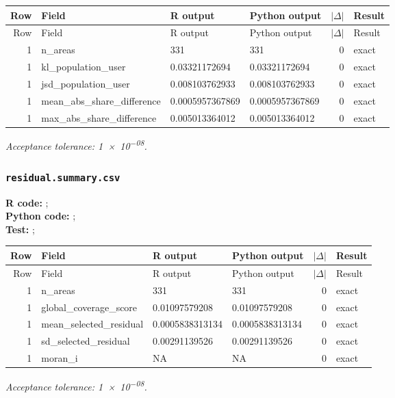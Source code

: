 \documentclass[10pt]{article}
\begin{document}
\small
\begin{longtable}{@{}r p{}p{}p{}rl@{}}
\toprule
Row & Field & R output & Python output & $|\Delta|$ & Result \\
\midrule
\endfirsthead
\toprule
Row & Field & R output & Python output & $|\Delta|$ & Result \\
\midrule
\endhead
1 & n\_\allowbreak{}areas & 331 & 331 & 0 & exact \\
1 & kl\_\allowbreak{}population\_\allowbreak{}user & 0.03321172694 & 0.03321172694 & 0 & exact \\
1 & jsd\_\allowbreak{}population\_\allowbreak{}user & 0.008103762933 & 0.008103762933 & 0 & exact \\
1 & mean\_\allowbreak{}abs\_\allowbreak{}share\_\allowbreak{}difference & 0.0005957367869 & 0.0005957367869 & 0 & exact \\
1 & max\_\allowbreak{}abs\_\allowbreak{}share\_\allowbreak{}difference & 0.005013364012 & 0.005013364012 & 0 & exact \\
\bottomrule
\end{longtable}
\normalsize
\textit{Acceptance tolerance: \num{1e-08}.}

\subsubsection{\texorpdfstring{\texttt{residual.summary.csv}}{residual.summary.csv}}
{\footnotesize \textbf{R code:} ; \\ \textbf{Python code:} ; \\ \textbf{Test:} ; \par}

\small
\begin{longtable}{@{}r p{}p{}p{}rl@{}}
\toprule
Row & Field & R output & Python output & $|\Delta|$ & Result \\
\midrule
\endfirsthead
\toprule
Row & Field & R output & Python output & $|\Delta|$ & Result \\
\midrule
\endhead
1 & n\_\allowbreak{}areas & 331 & 331 & 0 & exact \\
1 & global\_\allowbreak{}coverage\_\allowbreak{}score & 0.01097579208 & 0.01097579208 & 0 & exact \\
1 & mean\_\allowbreak{}selected\_\allowbreak{}residual & 0.0005838313134 & 0.0005838313134 & 0 & exact \\
1 & sd\_\allowbreak{}selected\_\allowbreak{}residual & 0.00291139526 & 0.00291139526 & 0 & exact \\
1 & moran\_\allowbreak{}i & NA & NA & 0 & exact \\
\bottomrule
\end{longtable}
\normalsize
\textit{Acceptance tolerance: \num{1e-08}.}
\end{document}
